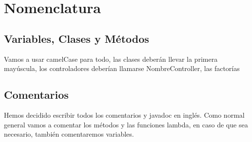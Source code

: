 \documentclass[a4paper]{article}
\begin{document}
	\section{Nomenclatura}
		\subsection{Variables, Clases y Métodos}
			Vamos a usar camelCase para todo, las clases deberán llevar la primera mayúscula,
			los controladores deberían llamarse NombreController, las factorías
		\subsection{Comentarios}
			Hemos decidido escribir todos los comentarios y javadoc en inglés.
			Como normal general vamos a comentar los métodos y las funciones lambda,
			en caso de que sea necesario, también comentaremos variables.
\end{document}
